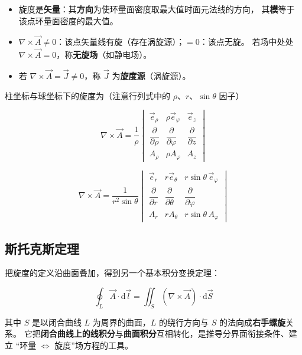 \begin{itemize}
    \item 旋度是\textbf{矢量}：其\textbf{方向}为使环量面密度取最大值时面元法线的方向，
    其\textbf{模}等于该点环量面密度的最大值。
    \item $\nabla\times\vec{A}\neq 0$：该点矢量线有旋（存在涡旋源）；$=0$：该点无旋。
    若场中处处 $\nabla\times\vec{A}=0$，称\textbf{无旋场}（如静电场）。
    \item 若 $\nabla\times\vec{A}=\vec{J}\neq 0$，称 $\vec{J}$ 为\textbf{旋度源}（涡旋源）。
\end{itemize}

柱坐标与球坐标下的旋度为（注意行列式中的 $\rho$、$r$、$\sin\theta$ 因子）
\begin{formulaBox}
\[
\nabla\times\vec{A}=\frac{1}{\rho}
\begin{vmatrix}
\vec{e}_\rho & \rho\vec{e}_\varphi & \vec{e}_z\\[2pt]
\dfrac{\partial}{\partial\rho} & \dfrac{\partial}{\partial\varphi} & \dfrac{\partial}{\partial z}\\[6pt]
A_\rho & \rho A_\varphi & A_z
\end{vmatrix}
\]
\end{formulaBox}
\begin{formulaBox}
\[
\nabla\times\vec{A}=\frac{1}{r^2\sin\theta}
\begin{vmatrix}
\vec{e}_r & r\vec{e}_\theta & r\sin\theta\,\vec{e}_\varphi\\[2pt]
\dfrac{\partial}{\partial r} & \dfrac{\partial}{\partial\theta} & \dfrac{\partial}{\partial\varphi}\\[6pt]
A_r & rA_\theta & r\sin\theta\,A_\varphi
\end{vmatrix}
\]
\end{formulaBox}

\subsection{斯托克斯定理}

把旋度的定义沿曲面叠加，得到另一个基本积分变换定理：
\begin{formulaBox}
\[
\oint_L\vec{A}\cdot\mathrm{d}\vec{l}=\iint_S(\nabla\times\vec{A})\cdot\mathrm{d}\vec{S}
\]
\end{formulaBox}

其中 $S$ 是以闭合曲线 $L$ 为周界的曲面，$L$ 的绕行方向与 $S$ 的法向成\textbf{右手螺旋}关系。
它把\textbf{闭合曲线上的线积分}与\textbf{曲面积分}互相转化，是推导分界面衔接条件、建立
“环量 $\Leftrightarrow$ 旋度”场方程的工具。

